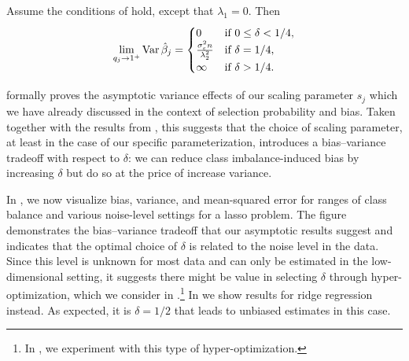 \begin{corollary}
  \label{cor:ridge-variance}
  Assume the conditions of  hold, except that \(\lambda_1 = 0\). Then
  \[
    \lim_{q_j \rightarrow 1^+} \operatorname{Var} \hat{\beta}_j =
    \begin{cases}
      0                                          & \text{if } 0 \leq \delta < 1/4, \\
      \frac{\sigma_\varepsilon^2 n}{\lambda_2^2} & \text{if } \delta = 1/4,        \\
      \infty                                     & \text{if } \delta > 1/4.
    \end{cases}
  \]
\end{corollary}

 formally proves the asymptotic variance effects of our
scaling parameter \(s_j\) which we have already discussed in the context of selection
probability and bias. Taken together with the results from ,
this suggests that the choice of scaling parameter, at least in the case of our specific
parameterization, introduces a bias--variance tradeoff with respect to \(\delta\): we can
reduce class imbalance-induced bias by increasing \(\delta\) but do so at the price of
increase variance.

In , we now visualize bias, variance, and mean-squared
error for ranges of class balance and various noise-level settings for a lasso problem. The
figure demonstrates the bias--variance tradeoff that our asymptotic results suggest and
indicates that the optimal choice of \(\delta\) is related to the noise level in the data.
Since this level is unknown for most data and can only be estimated in the low-dimensional
setting, it suggests there might be value in selecting \(\delta\) through
hyper-optimization, which we consider in .\footnote{In
  , we experiment with this type of hyper-optimization.}
In  we show results for ridge regression instead. As
expected, it is \(\delta = 1/2\) that leads to unbiased estimates in this case.

